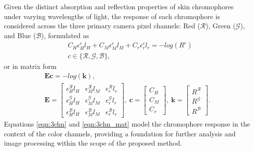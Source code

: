 \begin{spacing}{1.5}
Given the distinct absorption and reflection properties of skin chromophores under varying wavelengths of light, the response of each chromophore is considered across the three primary camera pixel channels: Red ($\mathcal{R}$), Green ($\mathcal{G}$), and Blue ($\mathcal{B}$), formulated as
\begin{equation}
    \begin{aligned}
         & C_H\epsilon_H^c l_H + C_M\epsilon_M^c l_M + C_r\epsilon_r^c l_r = -log(R^c) \\
         & c\in\{\mathcal{R},\mathcal{G},\mathcal{B}\},
    \end{aligned}
    \label{eqn:3chn}
\end{equation}
or in matrix form
\begin{equation}
    \begin{gathered}
        \mathbf{E}\mathbf{c}=-log(\mathbf{k}),\\
        \mathbf{E}=\begin{bmatrix}
            \epsilon_H^\mathcal{R} l_H & \epsilon_M^\mathcal{R} l_M & \epsilon_r^\mathcal{R} l_r \\
            \epsilon_H^\mathcal{G} l_H & \epsilon_M^\mathcal{G} l_M & \epsilon_r^\mathcal{G} l_r \\
            \epsilon_H^\mathcal{B} l_H & \epsilon_M^\mathcal{B} l_M & \epsilon_r^\mathcal{B} l_r
        \end{bmatrix},\
        \mathbf{c}=\begin{bmatrix}C_H \\C_M \\C_r\end{bmatrix},\
        \mathbf{k}=\begin{bmatrix}R^\mathcal{R} \\R^\mathcal{G} \\R^\mathcal{B}\end{bmatrix}.
        \label{eqn:3chn_mat}
    \end{gathered}
\end{equation}
Equations \ref{eqn:3chn} and \ref{eqn:3chn_mat} model the chromophore response in the context of the color channels, providing a foundation for further analysis and image processing within the scope of the proposed method.


\end{spacing}
